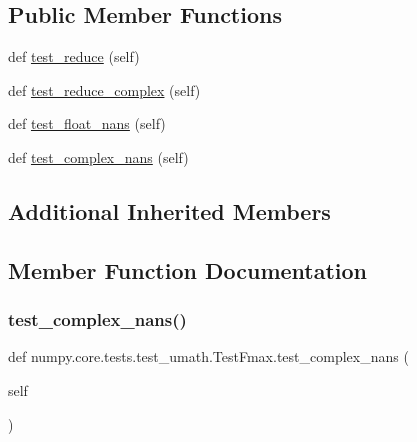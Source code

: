 \subsection*{Public Member Functions}
\begin{DoxyCompactItemize}
\item 
def \hyperlink{classnumpy_1_1core_1_1tests_1_1test__umath_1_1TestFmax_ab72a443bf2065e9910912f46de55e8ee}{test\+\_\+reduce} (self)
\item 
def \hyperlink{classnumpy_1_1core_1_1tests_1_1test__umath_1_1TestFmax_a2ce16d37c8fd5194dd03c11ef3cc67de}{test\+\_\+reduce\+\_\+complex} (self)
\item 
def \hyperlink{classnumpy_1_1core_1_1tests_1_1test__umath_1_1TestFmax_a58c14681222016d65a63bde3ee2b5a52}{test\+\_\+float\+\_\+nans} (self)
\item 
def \hyperlink{classnumpy_1_1core_1_1tests_1_1test__umath_1_1TestFmax_a894f968d9d86205679c0101cdb297585}{test\+\_\+complex\+\_\+nans} (self)
\end{DoxyCompactItemize}
\subsection*{Additional Inherited Members}


\subsection{Member Function Documentation}
\mbox{\label{classnumpy_1_1core_1_1tests_1_1test__umath_1_1TestFmax_a894f968d9d86205679c0101cdb297585}} 
\subsubsection{\texorpdfstring{test\+\_\+complex\+\_\+nans()}{test\_complex\_nans()}}
{\footnotesize\ttfamily def numpy.\+core.\+tests.\+test\+\_\+umath.\+Test\+Fmax.\+test\+\_\+complex\+\_\+nans (\begin{DoxyParamCaption}\item[{}]{self }\end{DoxyParamCaption})}

